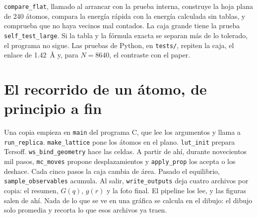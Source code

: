 \documentclass[11pt,a4paper]{article}
\newcommand{\fn}[1]{\texttt{#1}}
\begin{document}
\fn{compare\_flat}, llamado al arrancar con la prueba interna, construye la hoja plana de 240 átomos, compara la energía rápida con la energía calculada sin tablas, y comprueba que no haya vecinos mal contados. La caja grande tiene la prueba \fn{self\_test\_large}. Si la tabla y la fórmula exacta se separan más de lo tolerado, el programa no sigue. Las pruebas de Python, en \fn{tests/}, repiten la caja, el enlace de 1.42~Å y, para $N=8640$, el contraste con el paper.

\section{El recorrido de un átomo, de principio a fin}

Una copia empieza en \fn{main} del programa C, que lee los argumentos y llama a \fn{run\_replica}. \fn{make\_lattice} pone los átomos en el plano. \fn{lut\_init} prepara Tersoff. \fn{ws\_bind\_geometry} hace las celdas. A partir de ahí, durante novecientos mil pasos, \fn{mc\_moves} propone desplazamientos y \fn{apply\_prop} los acepta o los deshace. Cada cinco pasos la caja cambia de área. Pasado el equilibrio, \fn{sample\_observables} acumula. Al salir, \fn{write\_outputs} deja cuatro archivos por copia: el resumen, $G(q)$, $g(r)$ y la foto final. El pipeline los lee, y las figuras salen de ahí. Nada de lo que se ve en una gráfica se calcula en el dibujo: el dibujo solo promedia y recorta lo que esos archivos ya traen.
\end{document}
